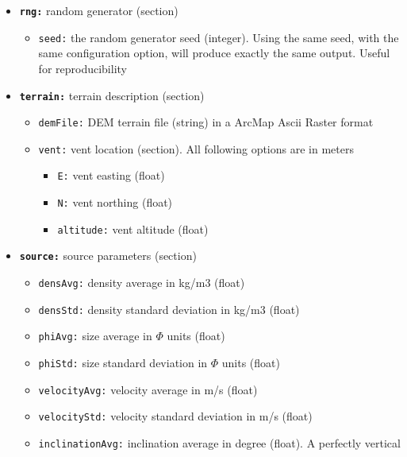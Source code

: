 \documentclass[10pt,a4paper]{article}
\begin{document}
\begin{itemize}
\item \textbf{\texttt{\textsf{\color{namecolor}rng:}}} random generator (section)
	\begin{itemize}
	\item \texttt{\textsf{\color{namecolor}seed:}} the random generator seed (integer). Using the same seed,
	with the same configuration option, will produce exactly the same
	output. Useful for reproducibility
	\end{itemize}
\item \textbf{\texttt{\textsf{\color{namecolor}terrain:}}} terrain description (section)
	\begin{itemize}
	\item \texttt{\textsf{\color{namecolor}demFile:}} DEM terrain file (string) in a ArcMap Ascii Raster format
	\item \texttt{\textsf{\color{namecolor}vent:}} vent location (section). All following options are in meters
		\begin{itemize}
		\item \texttt{\textsf{\color{namecolor}E:}} vent easting (float)
		\item \texttt{\textsf{\color{namecolor}N:}} vent northing (float)
		\item \texttt{\textsf{\color{namecolor}altitude:}} vent altitude (float)
		\end{itemize}
	\end{itemize}
\item \textbf{\texttt{\textsf{\color{namecolor}source:}}} source parameters (section)
	\begin{itemize}
	\item \texttt{\textsf{\color{namecolor}densAvg:}} density average in kg/m3 (float)
	\item \texttt{\textsf{\color{namecolor}densStd:}} density standard deviation in kg/m3 (float)
	\item \texttt{\textsf{\color{namecolor}phiAvg:}} size average in $\Phi$ units (float)
	\item \texttt{\textsf{\color{namecolor}phiStd:}} size standard deviation in $\Phi$ units (float)
	\item \texttt{\textsf{\color{namecolor}velocityAvg:}} velocity average in m/s (float)
	\item \texttt{\textsf{\color{namecolor}velocityStd:}} velocity standard deviation in m/s (float)
	\item \texttt{\textsf{\color{namecolor}inclinationAvg:}} inclination average in degree (float). A perfectly vertical

\end{itemize}
\end{itemize}
\end{document}

